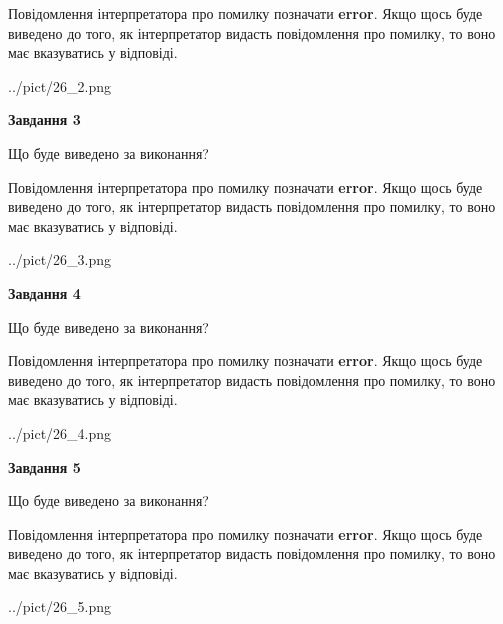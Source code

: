 \documentclass[12pt, ukrainian]{article}
\begin{document}
{\begin {large}
Повідомлення інтерпретатора про помилку позначати \textbf{error}.
Якщо щось буде виведено до того, як інтерпретатор видасть повідомлення про помилку, 
то воно має вказуватись у відповіді. \par


\begin{center}
	{../pict/26_2.png}
\end{center}
\newpage

{\begin {center}\textbf{Завдання 3}\end {center}}\par
Що буде виведено за виконання?

Повідомлення інтерпретатора про помилку позначати \textbf{error}.
Якщо щось буде виведено до того, як інтерпретатор видасть повідомлення про помилку, 
то воно має вказуватись у відповіді. \par


\begin{center}
	{../pict/26_3.png}
\end{center}
\newpage

{\begin {center}\textbf{Завдання 4}\end {center}}\par
Що буде виведено за виконання?

Повідомлення інтерпретатора про помилку позначати \textbf{error}.
Якщо щось буде виведено до того, як інтерпретатор видасть повідомлення про помилку, 
то воно має вказуватись у відповіді. \par


\begin{center}
	{../pict/26_4.png}
\end{center}
\newpage

{\begin {center}\textbf{Завдання 5}\end {center}}\par
Що буде виведено за виконання?

Повідомлення інтерпретатора про помилку позначати \textbf{error}.
Якщо щось буде виведено до того, як інтерпретатор видасть повідомлення про помилку, 
то воно має вказуватись у відповіді. \par


\begin{center}
	{../pict/26_5.png}
\end{center}
\newpage


\end{large}}
\end{document}
